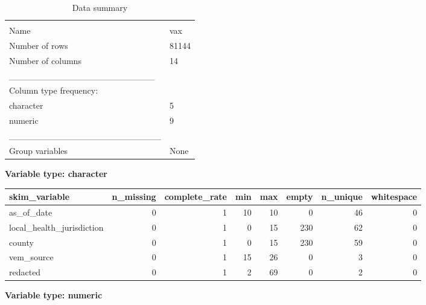 \documentclass[
]{article}
\begin{document}
\begin{longtable}[]{@{}ll@{}}
\caption{Data summary}\tabularnewline
\toprule
& \\
\midrule
\endfirsthead
\toprule
& \\
\midrule
\endhead
Name & vax \\
Number of rows & 81144 \\
Number of columns & 14 \\
\_\_\_\_\_\_\_\_\_\_\_\_\_\_\_\_\_\_\_\_\_\_\_ & \\
Column type frequency: & \\
character & 5 \\
numeric & 9 \\
\_\_\_\_\_\_\_\_\_\_\_\_\_\_\_\_\_\_\_\_\_\_\_\_ & \\
Group variables & None \\
\bottomrule
\end{longtable}

\textbf{Variable type: character}

\begin{longtable}[]{@{}lrrrrrrr@{}}
\toprule
skim\_variable & n\_missing & complete\_rate & min & max & empty &
n\_unique & whitespace \\
\midrule
\endhead
as\_of\_date & 0 & 1 & 10 & 10 & 0 & 46 & 0 \\
local\_health\_jurisdiction & 0 & 1 & 0 & 15 & 230 & 62 & 0 \\
county & 0 & 1 & 0 & 15 & 230 & 59 & 0 \\
vem\_source & 0 & 1 & 15 & 26 & 0 & 3 & 0 \\
redacted & 0 & 1 & 2 & 69 & 0 & 2 & 0 \\
\bottomrule
\end{longtable}

\textbf{Variable type: numeric}
\end{document}
